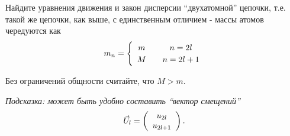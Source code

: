 \documentclass[a4paper,12pt]{article}
\begin{document}
\noindent Найдите уравнения движения и закон дисперсии “двухатомной” цепочки, т.е. такой же цепочки, как выше, с единственным отличием - массы атомов чередуются как
\begin{equation}\notag
m_{n}	=\begin{cases}
\begin{array}{c}
m\\
M
\end{array} & \begin{array}{c}
n=2l\\
n=2l+1
\end{array}\end{cases}
\end{equation}


\noindent Без ограничений общности считайте, что $M>m$.

\noindent \textit{Подсказка: может быть удобно составить “вектор смещений”}
\begin{equation}\notag
\vec{U}_{l}	=\left(\begin{array}{c}
u_{2l}\\
u_{2l+1}
\end{array}\right).
\end{equation}
\end{document}
